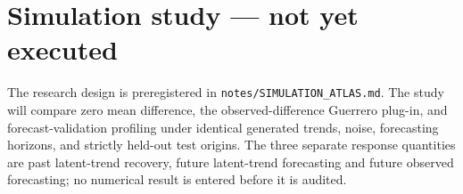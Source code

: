 \section{Simulation study --- not yet executed}
The research design is preregistered in
\texttt{notes/SIMULATION\_ATLAS.md}.
The study will compare zero mean difference, the observed-difference
Guerrero plug-in, and forecast-validation profiling under
identical generated trends, noise, forecasting horizons, and
strictly held-out test origins.
The three separate response quantities are past latent-trend
recovery, future latent-trend forecasting and future observed
forecasting; no numerical result is entered before it is audited.
